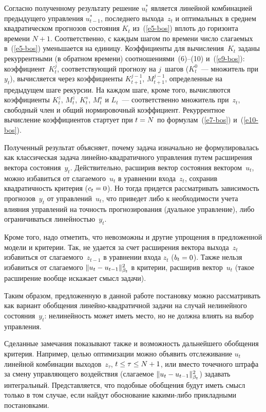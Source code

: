 \begin{multicols}{2}
 \smallskip

 Согласно полученному результату решение $u_t^*$ является линейной
комбинацией предыдущего управления $u_{t-1}^*$, последнего выхода~$z_t$ и
оптимальных в среднем квадратическом прогнозов состояния $K_t$
из~(\ref{e5-bos}) вплоть до горизонта времени $N+1$. Соответственно, с
каждым шагом по времени число сла\-га\-емых
 в~(\ref{e5-bos}) уменьшается на единицу. Коэффициенты для
вычисления~$K_t$ заданы рекуррентными (в обратном времени)
соотношениями~(6)--(10) и~(\ref{e9-bos}): коэффициент~$K_t^j$,
соответствующий прогнозу на $j$~шагов ($K_t^0$~--- множитель при~$y_t$),
вычисляется через коэффициенты $K_{t+1}^{j-1}$,
 $M_{t+1}^{j-1}$, определенные на предыдущем шаге рекурсии. На
каждом шаге, кроме того, вычисляются коэффициенты $K_t^z$, $M_t^z$,
$K_t^s$, $M_t^s$ и $L_t$~--- соответственно множитель при~$z_t$, свободный
член и общий нормировочный коэффициент. Рекуррентное вычисление
коэффициентов стартует при $t\hm=N$ по формулам~(\ref{e7-bos})
и~(\ref{e10-bos}).

 Полученный результат объясняет, почему задача изначально не
формулировалась как классическая задача ли\-ней\-но-квад\-ра\-тич\-но\-го
управления путем расширения вектора состояния~$y_t$. Действительно,
расширив вектор состояния вектором~$u_t$, можно избавиться от
слагаемого~$u_t$ в уравнении входа~$z_t$, сохранив квадратичность критерия
($c_t\hm=0$). Но тогда придется рассматривать зависимость прогнозов~$y_t$
от управ\-ле\-ний~$u_t$, что приведет либо к не\-об\-хо\-ди\-мости учета влияния
управ\-ле\-ний на точ\-ность прогнозирования (дуальное управление), либо
ограничиваться линейностью~$y_t$.

 Кроме того, надо отметить, что невозможны и другие упрощения в
предложенной модели и критерии. Так, не удается за счет расширения вектора
выхода~$z_t$ избавиться от слагаемого~$z_{t-1}$ в уравнении входа $z_t$
($b_t\hm=0$). Также нельзя избавиться от слагаемого
 $\| u_t\hm- u_{t-1}\|^2_{\beta_t}$ в критерии, расширив вектор~$u_t$
(такое расширение вообще искажает смысл задачи).

 Таким образом, предложенную в данной работе постановку можно
рассматривать как вариант обобщения ли\-ней\-но-квад\-ра\-тич\-ной задачи на
случай нелинейного состояния~$y_t$: нелинейность может иметь место, но не
должна влиять на выбор управления.

 Сделанные замечания показывают также и возможность дальнейшего
обобщения критерия. Например, целью оптимизации можно объявить
отслеживание $u_t$ линейной комбинации выходов~$z_\tau$, $t\hm\leq
\tau\hm\leq N+1$, или вместо точечного штрафа за смену управляющего
воздействия (слагаемое $\| u_t\hm- u_{t-1}\|^2_{\beta_t}$) задавать
интегральный. Представляется, что подобные обобщения будут иметь смысл
только в том случае, если найдут обоснование
 ка\-ки\-ми-ли\-бо прикладными постановками.


\end{multicols}
